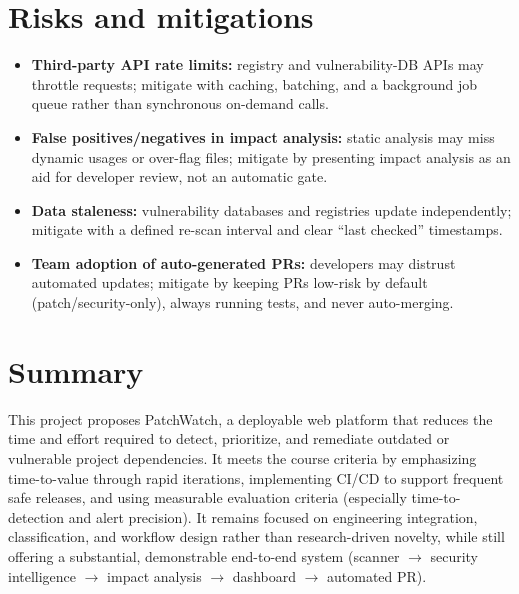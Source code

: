 \documentclass[11pt,a4paper]{article}
\begin{document}
\section{Risks and mitigations}
\begin{itemize}[leftmargin=0.7cm]
    \item \textbf{Third-party API rate limits:} registry and vulnerability-DB APIs may throttle requests; mitigate with caching, batching, and a background job queue rather than synchronous on-demand calls.
    \item \textbf{False positives/negatives in impact analysis:} static analysis may miss dynamic usages or over-flag files; mitigate by presenting impact analysis as an aid for developer review, not an automatic gate.
    \item \textbf{Data staleness:} vulnerability databases and registries update independently; mitigate with a defined re-scan interval and clear ``last checked'' timestamps.
    \item \textbf{Team adoption of auto-generated PRs:} developers may distrust automated updates; mitigate by keeping PRs low-risk by default (patch/security-only), always running tests, and never auto-merging.
\end{itemize}

\section{Summary}
This project proposes PatchWatch, a deployable web platform that reduces the time and effort required to detect, prioritize, and remediate outdated or vulnerable project dependencies. It meets the course criteria by emphasizing time-to-value through rapid iterations, implementing CI/CD to support frequent safe releases, and using measurable evaluation criteria (especially time-to-detection and alert precision). It remains focused on engineering integration, classification, and workflow design rather than research-driven novelty, while still offering a substantial, demonstrable end-to-end system (scanner $\rightarrow$ security intelligence $\rightarrow$ impact analysis $\rightarrow$ dashboard $\rightarrow$ automated PR).
\end{document}
